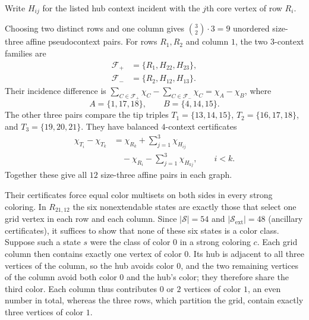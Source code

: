 \documentclass[aps,pra,reprint,superscriptaddress,longbibliography,nofootinbib,floatfix,10pt]{revtex4-2}
\theoremstyle{definition}\newtheorem{definition}[theorem]{Definition}
\theoremstyle{remark}\newtheorem{remark}[theorem]{Remark}
\newcommand{\Sc}{\mathcal S}\newcommand{\Cc}{\mathcal C}\newcommand{\Wc}{\mathcal W}
\begin{document}
Write $H_{ij}$ for the listed hub context incident with the $j$th core vertex of row $R_i$.

Choosing two distinct rows and one column gives $\binom32\cdot3=9$ unordered size-three affine pseudocontext pairs. For rows $R_1,R_2$ and column $1$, the two $3$-context families are
\begin{equation}\label{eq:R21-three-coverings}
\begin{aligned}
\mathcal F_+&=\{R_1,H_{22},H_{23}\},\\
\mathcal F_-&=\{R_2,H_{12},H_{13}\}.
\end{aligned}
\end{equation}
Their incidence difference is $\sum_{C\in\mathcal F_+}\chi_C-\sum_{C\in\mathcal F_-}\chi_C=\chi_A-\chi_B$, where
\begin{equation}\label{eq:R21-paired3}
A=\{1,17,18\},\qquad B=\{4,14,15\}.
\end{equation}
The other three pairs compare the tip triples $T_1=\{13,14,15\}$, $T_2=\{16,17,18\}$, and $T_3=\{19,20,21\}$. They have balanced $4$-context certificates
\begin{equation}\label{eq:R21-four-coverings}
\begin{aligned}
\chi_{T_i}-\chi_{T_k}
&=\chi_{R_k}+\sum_{j=1}^3\chi_{H_{ij}}\\
&\quad-\chi_{R_i}-\sum_{j=1}^3\chi_{H_{kj}},\qquad i<k.
\end{aligned}
\end{equation}
Together these give all $12$ size-three affine pairs in each graph.

Their certificates force equal color multisets on both sides in every strong coloring. In $R_{21,12}$ the six nonextendable states are exactly those that select one grid vertex in each row and each column. Since $|\Sc|=54$ and $|\Sc_{\mathrm{ext}}|=48$ (ancillary certificates), it suffices to show that none of these six states is a color class. Suppose such a state $s$ were the class of color $0$ in a strong coloring $c$. Each grid column then contains exactly one vertex of color $0$. Its hub is adjacent to all three vertices of the column, so the hub avoids color $0$, and the two remaining vertices of the column avoid both color $0$ and the hub's color; they therefore share the third color. Each column thus contributes $0$ or $2$ vertices of color $1$, an even number in total, whereas the three rows, which partition the grid, contain exactly three vertices of color $1$.
\end{document}
